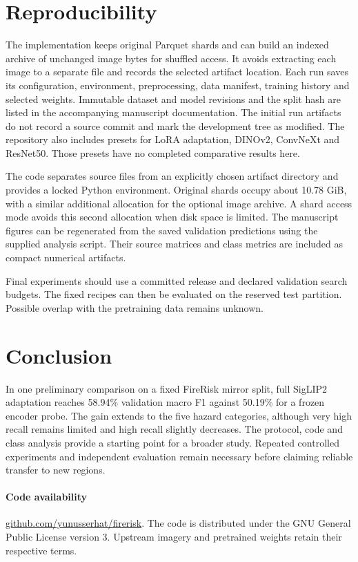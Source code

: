 \documentclass[10pt,a4paper]{article}
\newcommand{\paperrepository}{\href{https://github.com/yunusserhat/firerisk}{github.com/yunusserhat/firerisk}}
\begin{document}
\section{Reproducibility}

The implementation keeps original Parquet shards and can build an indexed
archive of unchanged image bytes for shuffled access. It avoids extracting
each image to a separate file and records the selected artifact location.
Each run saves its configuration, environment, preprocessing, data manifest,
training history and selected weights. Immutable dataset and model revisions
and the split hash are listed in the accompanying manuscript documentation.
The initial run artifacts do not record a source commit and mark the
development tree as modified.
The repository also includes presets for LoRA adaptation, DINOv2, ConvNeXt
and ResNet50. Those presets have no completed comparative results here.

The code separates source files from an explicitly chosen artifact directory
and provides a locked Python environment. Original shards occupy about
10.78 GiB, with a similar additional allocation for the optional image
archive. A shard access mode avoids this second allocation when disk space
is limited. The manuscript figures can be regenerated from the saved
validation predictions using the supplied analysis script. Their source
matrices and class metrics are included as compact numerical artifacts.

Final experiments should use a committed release and declared validation
search budgets. The fixed recipes can then be evaluated on the reserved
test partition. Possible overlap with the pretraining data remains unknown.

\section{Conclusion}

In one preliminary comparison on a fixed FireRisk mirror split, full SigLIP2
adaptation reaches 58.94\% validation macro F1 against 50.19\% for a frozen
encoder probe. The gain extends to the five hazard categories, although
very high recall remains limited and high recall slightly decreases.
The protocol, code and class analysis provide a starting point for a
broader study. Repeated controlled experiments and independent evaluation
remain necessary before claiming reliable transfer to new regions.

\paragraph{Code availability}
\paperrepository. The code is distributed under the GNU General Public
License version 3. Upstream imagery and pretrained weights retain their
respective terms.

\begingroup
\small
\setlength{\bibsep}{4pt}


\endgroup
\end{document}
